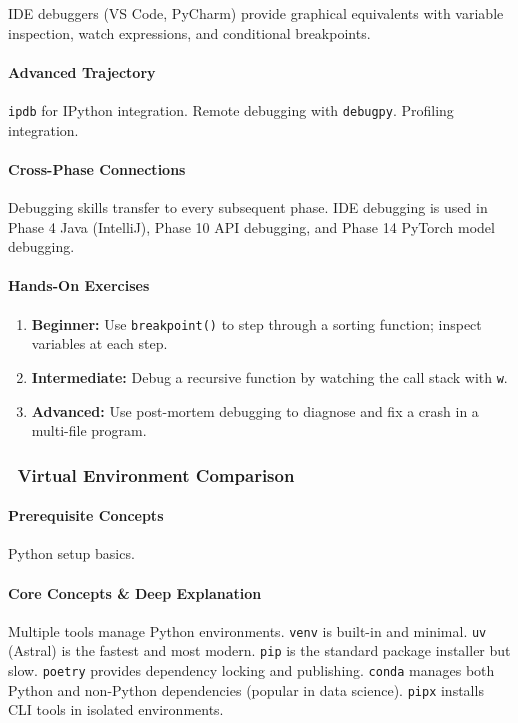 \documentclass[11pt, a4paper, oneside]{report}
\newcommand{\awareness}[1]{\subsubsection{\texorpdfstring{\fcolorbox{gray!50}{gray!10}{\footnotesize\bfseries\color{gray!50!black} AWARENESS}~#1}{#1}}}
\begin{document}
IDE debuggers (VS Code, PyCharm) provide graphical equivalents with variable inspection, watch expressions, and conditional breakpoints.

\paragraph{Advanced Trajectory} \texttt{ipdb} for IPython integration. Remote debugging with \texttt{debugpy}. Profiling integration.

\paragraph{Cross-Phase Connections} Debugging skills transfer to every subsequent phase. IDE debugging is used in Phase 4 Java (IntelliJ), Phase 10 API debugging, and Phase 14 PyTorch model debugging.

\paragraph{Hands-On Exercises}
\begin{enumerate}[leftmargin=*]
\item \textbf{Beginner:} Use \texttt{breakpoint()} to step through a sorting function; inspect variables at each step.
\item \textbf{Intermediate:} Debug a recursive function by watching the call stack with \texttt{w}.
\item \textbf{Advanced:} Use post-mortem debugging to diagnose and fix a crash in a multi-file program.
\end{enumerate}

\awareness{Virtual Environment Comparison}

\paragraph{Prerequisite Concepts} Python setup basics.

\paragraph{Core Concepts \& Deep Explanation} Multiple tools manage Python environments. \texttt{venv} is built-in and minimal. \texttt{uv} (Astral) is the fastest and most modern. \texttt{pip} is the standard package installer but slow. \texttt{poetry} provides dependency locking and publishing. \texttt{conda} manages both Python and non-Python dependencies (popular in data science). \texttt{pipx} installs CLI tools in isolated environments.
\end{document}
